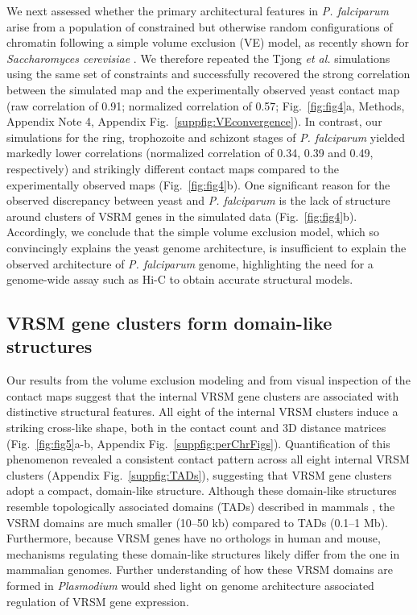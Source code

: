 We next assessed whether the primary architectural features in {\em P.
falciparum} arise from a population of constrained but otherwise random
configurations of chromatin following a simple volume exclusion (VE) model, as
recently shown for {\em Saccharomyces cerevisiae} \citep{tjong:physical}. We
therefore repeated the Tjong {\em et al.} simulations using the same set of
constraints and successfully recovered the strong correlation between the
simulated map and the experimentally observed yeast contact map (raw
correlation of 0.91; normalized correlation of 0.57; Fig.~\ref{fig:fig4}a,
Methods, Appendix Note 4, Appendix
Fig.~\ref{suppfig:VEconvergence}). In contrast, our simulations for the ring,
trophozoite and schizont stages of {\em P. falciparum} yielded markedly lower
correlations (normalized correlation of 0.34, 0.39 and 0.49, respectively) and
strikingly different contact maps compared to the experimentally observed maps
(Fig.~\ref{fig:fig4}b). One significant reason for the observed discrepancy
between yeast and {\em P. falciparum} is the lack of structure around clusters
of VSRM genes in the simulated data (Fig.~\ref{fig:fig4}b). Accordingly, we
conclude that the simple volume exclusion model, which so convincingly
explains the yeast genome architecture, is insufficient to explain the
observed architecture of {\em P. falciparum} genome, highlighting the need for
a genome-wide assay such as Hi-C to obtain accurate structural models.

\subsection{VRSM gene clusters form domain-like structures}

Our results from the volume exclusion modeling and from visual inspection of
the contact maps suggest that the internal VRSM gene clusters are associated
with distinctive structural features. All eight of the internal VRSM clusters
induce a striking cross-like shape, both in the contact count and 3D distance
matrices (Fig.~\ref{fig:fig5}a-b, Appendix
Fig.~\ref{suppfig:perChrFigs}). Quantification of this phenomenon revealed a
consistent contact pattern across all eight internal VRSM clusters
(Appendix Fig.~\ref{suppfig:TADs}), suggesting that VRSM gene clusters
adopt a compact, domain-like structure. Although these domain-like structures
resemble topologically associated domains (TADs) described in mammals
\citep{dixon:topological, nora:spatial}, the VSRM domains are much smaller
(10--50 kb) compared to TADs (0.1--1 Mb). Furthermore, because VRSM genes have
no orthologs in human and mouse, mechanisms regulating these domain-like
structures likely differ from the one in mammalian genomes. Further
understanding of how these VRSM domains are formed in  \emph{Plasmodium} would
shed light on genome architecture associated regulation of VRSM gene
expression.

